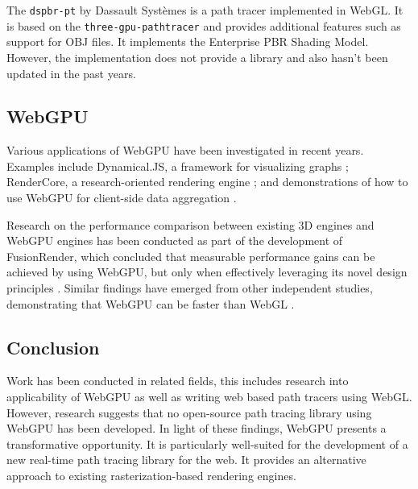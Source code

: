 The \texttt{dspbr-pt} by Dassault Systèmes \cite{PathTracerDassault} is a path tracer implemented in WebGL. It is based on the \texttt{three-gpu-pathtracer} and provides additional features such as support for \gls{OBJ} files. It implements the Enterprise PBR Shading Model. However, the implementation does not provide a library and also hasn't been updated in the past years.

\subsection*{WebGPU}

Various applications of WebGPU have been investigated in recent years. Examples include Dynamical.JS, a framework for visualizing graphs \cite{dotson2022dynamicaljs}; RenderCore, a research-oriented rendering engine \cite{Bohak_Kovalskyi_Linev_Mrak_Tadel_Strban_Tadel_Yagil_2024}; and demonstrations of how to use WebGPU for client-side data aggregation \cite{kimmersdorfer2023webgpu}.

Research on the performance comparison between existing 3D engines and WebGPU engines has been conducted as part of the development of FusionRender, which concluded that measurable performance gains can be achieved by using WebGPU, but only when effectively leveraging its novel design principles \cite{fusionRenderWebGPU}. Similar findings have emerged from other independent studies, demonstrating that WebGPU can be faster than WebGL \cite{webGPUWebGis, fransson2023performance, CHICKERUR2024919}.

\subsection*{Conclusion}

Work has been conducted in related fields, this includes research into applicability of WebGPU as well as writing web based path tracers using WebGL. However, research suggests that no open-source path tracing library using WebGPU has been developed. In light of these findings, WebGPU presents a transformative opportunity. It is particularly well-suited for the development of a new real-time path tracing library for the web. It provides an alternative approach to existing rasterization-based rendering engines.
